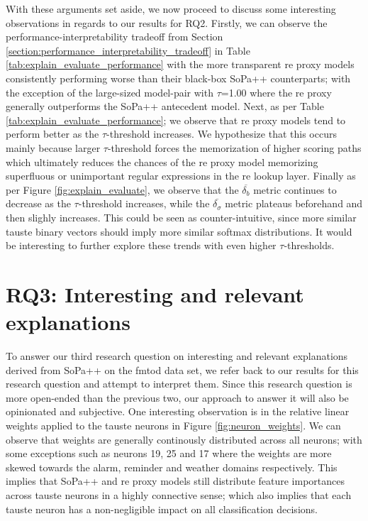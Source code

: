With these arguments set aside, we now proceed to discuss some interesting
observations in regards to our results for RQ2. Firstly, we can observe the
performance-interpretability tradeoff from Section
\ref{section:performance_interpretability_tradeoff} in Table
\ref{tab:explain_evaluate_performance} with the more transparent \ac{re} proxy models
consistently performing worse than their black-box SoPa++ counterparts; with the
exception of the large-sized model-pair with $\tau$=1.00 where the \ac{re} proxy
generally outperforms the SoPa++ antecedent model. Next, as per Table
\ref{tab:explain_evaluate_performance}; we observe that \ac{re} proxy models tend to
perform better as the $\tau$-threshold increases. We hypothesize that this
occurs mainly because larger $\tau$-threshold forces the memorization of higher
scoring paths which ultimately reduces the chances of the \ac{re} proxy model
memorizing superfluous or unimportant regular expressions in the \ac{re} lookup
layer. Finally as per Figure \ref{fig:explain_evaluate}, we
observe that the $\overline{\delta_{b}}$ metric continues to decrease as the
$\tau$-threshold increases, while the $\overline{\delta_{\sigma}}$ metric
plateaus beforehand and then slighly increases. This could be seen as
counter-intuitive, since more similar \ac{tauste} binary vectors should imply more
similar softmax distributions. It would be interesting to further explore these
trends with even higher $\tau$-thresholds.

\section{RQ3: Interesting and relevant explanations}

\label{section:discussion_regex}

To answer our third research question on interesting and relevant explanations
derived from SoPa++ on the \ac{fmtod} data set, we refer back to our results for this
research question and attempt to interpret them. Since this research question is
more open-ended than the previous two, our approach to answer it will also be
opinionated and subjective. One interesting observation is in the relative
linear weights applied to the \ac{tauste} neurons in Figure \ref{fig:neuron_weights}.
We can observe that weights are generally continously distributed across all
neurons; with some exceptions such as neurons 19, 25 and 17 where the weights
are more skewed towards the alarm, reminder and weather domains respectively.
This implies that SoPa++ and \ac{re} proxy models still distribute feature
importances across \ac{tauste} neurons in a highly connective sense; which also implies that
each \ac{tauste} neuron has a non-negligible impact on all classification decisions.

